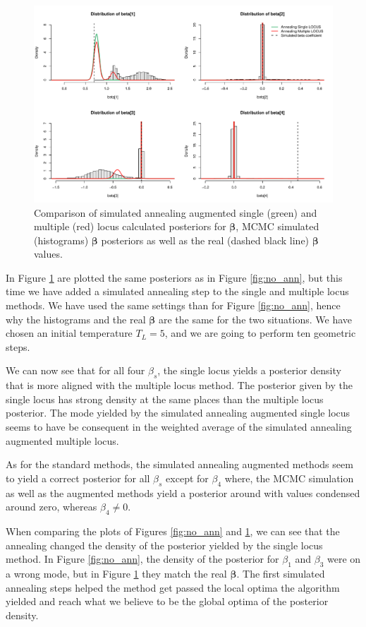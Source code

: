 \documentclass[a4paper, 11pt]{report}
\numberwithin{equation}{chapter}
\begin{document}
\begin{figure}[h]
\includegraphics[width=\textwidth, bb=0 0 800px 600px]{images/annealing.pdf}
\caption{\label{fig:ann}Comparison of simulated annealing augmented single (green) and multiple (red) locus calculated posteriors for $\boldsymbol{\beta}$, MCMC simulated (histograms) $\boldsymbol{\beta}$ posteriors as well as the real (dashed black line) $\boldsymbol{\beta}$ values.}
\end{figure}
In Figure \ref{fig:ann} are plotted the same posteriors as in Figure \ref{fig:no_ann}, but this time we have added a simulated annealing step to the 
single and multiple locus methods. We have used the same settings than for Figure \ref{fig:no_ann}, hence why the histograms and the real $
\boldsymbol{\beta}$ are the same for the two situations. We have chosen an initial temperature $T_L = 5$, and we are going to perform ten geometric steps.

We can now see that for all four $\beta_s$, the single locus yields a posterior density that is more aligned with the multiple locus method. The posterior given by the single locus has strong density at the same places than the multiple locus posterior. The mode yielded by the simulated annealing augmented single locus seems to have be consequent in the weighted average of the simulated annealing augmented multiple locus.

As for the standard methods, the simulated annealing augmented methods seem to yield a correct posterior for all $\beta_s$ except for $\beta_4$ where, the MCMC simulation as well as the augmented methods yield a posterior around with values condensed around zero, whereas $\beta_4 \neq 0$.

When comparing the plots of Figures \ref{fig:no_ann} and \ref{fig:ann}, we can see that the annealing changed the density of the posterior yielded by the single locus method. In Figure \ref{fig:no_ann}, the density of the posterior for $\beta_1$ and $\beta_3$ were on a wrong mode, but in Figure \ref{fig:ann} they match the real $\boldsymbol{\beta}$. The first simulated annealing steps helped the method get passed the local optima the algorithm yielded and reach what we believe to be the global optima of the posterior density.
\end{document}
